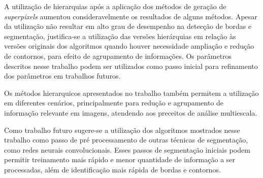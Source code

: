 \begin{document}
A utilização de hierarquias após a aplicação dos métodos de geração de \textit{superpixels} aumentou consideravelmente os resultados de alguns métodos. Apesar da utilização não resultar em alto grau de desempenho na detecção de bordas e segmentação, justifica-se a utilização das versões hierárquias em relação às versões originais dos algoritmos quando houver necessidade ampliação e redução de contornos, para efeito de agrupamento de informações. Os parâmetros descritos nesse trabalho podem ser utilizados como passo inicial para refinamento dos parâmetros em trabalhos futuros.

Os métodos hierarquicos apresentados no trabalho também permitem a utilização em diferentes cenários, principalmente para redução e agrupamento de informação relevante em imagens, atendendo aos preceitos de análise multiescala.

Como trabalho futuro sugere-se a utilização dos algoritmos mostrados nesse trabalho como passo de pré processamento de outras técnicas de segmentação, como redes neurais convolucionais. Esses passos de segmentação iniciais podem permitir treinamento mais rápido e menor quantidade de informação a ser processadas, além de identificação mais rápida de bordas e contornos.




\end{document}
